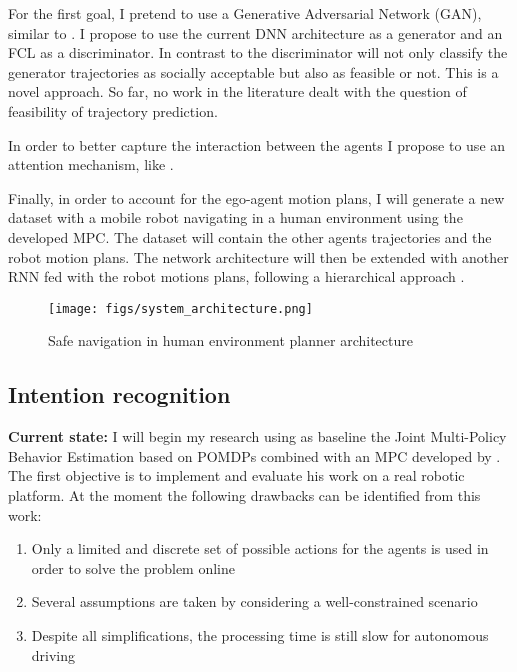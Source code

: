 For the first goal, I pretend to use a Generative Adversarial Network (GAN), similar to \cite{social-gan}. I propose to use the current DNN architecture as a generator and an FCL as a discriminator. In contrast to \cite{social-gan} the discriminator will not only classify the generator trajectories as socially acceptable but also as feasible or not. This is a novel approach. So far, no work in the literature dealt with the question of feasibility of trajectory prediction.

In order to better capture the interaction between the agents I propose to use an attention mechanism, like \cite{social-attention}.

Finally, in order to account for the ego-agent motion plans, I will generate a new dataset with a mobile robot navigating in a human environment using the developed MPC. The dataset will contain the other agents trajectories and the robot motion plans. The network architecture will then be extended with another RNN fed with the robot motions plans, following a hierarchical approach \cite{ss-lstm}.

\begin{figure}[h]
    \centering 
    \texttt{[image: figs/system\_architecture.png]}
    \caption{Safe navigation in human environment planner architecture}
    \label{fig:init_architecture}
\end{figure}

\subsection{Intention recognition}

\textbf{Current state:}
I will begin my research using as baseline the Joint Multi-Policy Behavior Estimation based on POMDPs combined with an MPC developed by \citeauthor{Zhou}. The first objective is to implement and evaluate his work on a real robotic platform. At the moment the following drawbacks can be identified from this work:
\begin{enumerate}
\item Only a limited and discrete set of possible actions for the agents is used in order to solve the problem online
\item Several assumptions are taken by considering a well-constrained scenario
\item Despite all simplifications, the processing time is still slow for autonomous driving
\end{enumerate}

